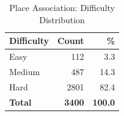 \begin{table}[htbp]
\centering
\caption{Place Association: Difficulty Distribution}
\label{tab:place_association_difficulty}
\begin{tabular}{lrr}
\toprule
\textbf{Difficulty} & \textbf{Count} & \textbf{\%} \\
\midrule
Easy & 112 & 3.3 \\
Medium & 487 & 14.3 \\
Hard & 2801 & 82.4 \\
\midrule
\textbf{Total} & \textbf{3400} & \textbf{100.0} \\
\bottomrule
\end{tabular}
\end{table}